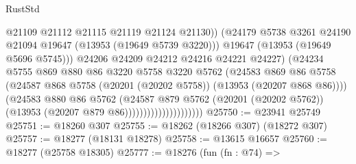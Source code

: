 \begin{lexlean}{RustStd}
\begin{coremodule}
                                            @21109
                                            @21112
                                            @21115
                                            @21119
                                            @21124
                                            @21130))
                                        (@24179
                                          @5738
                                          @3261
                                          @24190
                                          @21094
                                          @19647
                                          (@13953 (@19649 @5739 @3220)))
                                        @19647
                                        (@13953 (@19649 @5696 @5745)))
                                      @24206
                                      @24209
                                      @24212
                                      @24216
                                      @24221
                                      @24227)
                                    (@24234
                                      @5755
                                      @869
                                      @880
                                      @86
                                      @3220
                                      @5758
                                      @3220
                                      @5762
                                      (@24583
                                        @869
                                        @86
                                        @5758
                                        (@24587
                                          @868
                                          @5758
                                          (@20201 (@20202 @5758))
                                          (@13953 (@20207 @868 @86))))
                                      (@24583
                                        @880
                                        @86
                                        @5762
                                        (@24587
                                          @879
                                          @5762
                                          (@20201 (@20202 @5762))
                                          (@13953 (@20207 @879 @86)))))))))))))))))))))
@25750 := @23941 @25749
@25751 := @18260 @307
@25755 := @18262 (@18266 @307) (@18272 @307)
@25757 := @18277 (@18131 @18278)
@25758 := @13615 @16657
@25760 := @18277 (@25758 @18305)
@25777 := @18276
    (fun (fn : @74) =>

\end{coremodule}
\end{lexlean}

